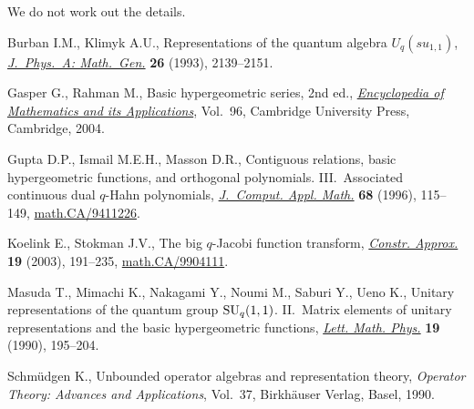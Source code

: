 \documentclass[11pt]{article}
\numberwithin{equation}{section}
\numberwithin{theorem}{section}
\numberwithin{proposition}{section}
\numberwithin{lemma}{section}
\numberwithin{corollary}{section}
\numberwithin{definition}{section}
\numberwithin{example}{section}
\numberwithin{remark}{section}
\numberwithin{note}{section}
\begin{document}
We do not work out the details.
\begin{thebibliography}{99}
Burban I.M., Klimyk A.U.,
Representations of the quantum algebra $U_q(su_{1,1})$,
\href{http://dx.doi.org/10.1088/0305-4470/26/9/011}{{\it J.~Phys.~A: Math.~Gen.}} \textbf{26} (1993), 2139--2151.

Gasper G., Rahman M.,
Basic hypergeometric series, 2nd ed.,
\href{http://dx.doi.org/10.1017/CBO9780511526251}{{\it Encyclopedia of Mathematics and its Applications}}, Vol.~96, Cambridge University Press, Cambridge, 2004.

Gupta D.P., Ismail M.E.H., Masson D.R.,
Contiguous relations, basic hypergeometric functions, and ortho\-go\-nal polynomials. III.~Associated continuous dual $q$-Hahn polynomials,
\href{http://dx.doi.org/10.1016/0377-0427(95)00264-2}{{\it J.~Comput. Appl. Math.}} \textbf{68} (1996), 115--149,
\href{http://arxiv.org/abs/math.CA/9411226}{math.CA/9411226}.

Koelink E., Stokman J.V.,
The big $q$-Jacobi function transform,
\href{http://dx.doi.org/10.1007/s00365-002-0498-x}{{\it Constr. Approx.}} \textbf{19} (2003), 191--235,
\href{http://arxiv.org/abs/math.CA/9904111}{math.CA/9904111}.

Masuda T., Mimachi K., Nakagami Y., Noumi M., Saburi Y., Ueno K.,
Unitary representations of the quantum group ${\rm SU}_q(1,1)$. II.~Matrix elements of unitary representations and the basic hypergeometric functions,
\href{http://dx.doi.org/10.1007/BF01039312}{{\it Lett. Math. Phys.}} {\bf 19} (1990),  195--204.

Schm\"udgen K.,
Unbounded operator algebras and representation theory,
{\it Operator Theory: Advances and Applications}, Vol.~37, Birkh\"auser Verlag, Basel, 1990.

\end{thebibliography}
\end{document}
